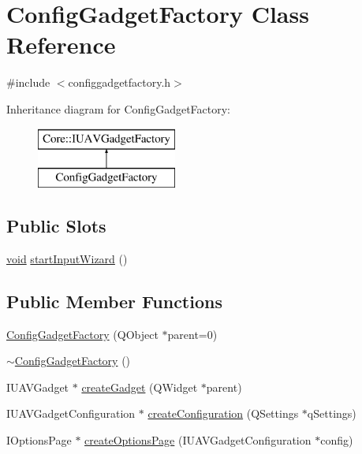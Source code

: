 \hypertarget{class_config_gadget_factory}{\section{\-Config\-Gadget\-Factory \-Class \-Reference}
\label{class_config_gadget_factory}
}


{\ttfamily \#include $<$configgadgetfactory.\-h$>$}

\-Inheritance diagram for \-Config\-Gadget\-Factory\-:\begin{figure}[H]
\begin{center}
\leavevmode
\includegraphics[height=2.000000cm]{class_config_gadget_factory}
\end{center}
\end{figure}
\subsection*{\-Public \-Slots}
\begin{DoxyCompactItemize}
\item 
\hyperlink{group___u_a_v_objects_plugin_ga444cf2ff3f0ecbe028adce838d373f5c}{void} \hyperlink{group___config_plugin_ga12d479e09d53195a2226e61b1690124f}{start\-Input\-Wizard} ()
\end{DoxyCompactItemize}
\subsection*{\-Public \-Member \-Functions}
\begin{DoxyCompactItemize}
\item 
\hyperlink{group___config_plugin_ga7785d39aeb34203184e554b3f3efda71}{\-Config\-Gadget\-Factory} (\-Q\-Object $\ast$parent=0)
\item 
\hyperlink{group___config_plugin_gad9021aa0495e8db3dbaf86f04d7ae1e1}{$\sim$\-Config\-Gadget\-Factory} ()
\item 
\-I\-U\-A\-V\-Gadget $\ast$ \hyperlink{group___config_plugin_ga0a27d1d7799dadf3e68617090af3054c}{create\-Gadget} (\-Q\-Widget $\ast$parent)
\item 
\-I\-U\-A\-V\-Gadget\-Configuration $\ast$ \hyperlink{group___config_plugin_gad4b30018cb53b866caf602b7f5409b0c}{create\-Configuration} (\-Q\-Settings $\ast$q\-Settings)
\item 
\-I\-Options\-Page $\ast$ \hyperlink{group___config_plugin_ga371219573cd1b14bbc5d533577281f7b}{create\-Options\-Page} (\-I\-U\-A\-V\-Gadget\-Configuration $\ast$config)
\end{DoxyCompactItemize}


